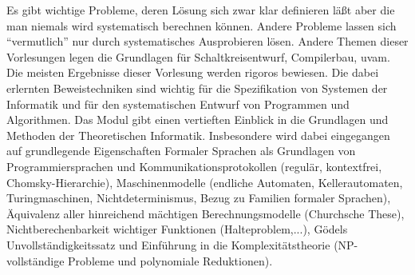\begin{module}
\begin{content}
Es gibt wichtige Probleme, deren Lösung sich zwar klar definieren läßt aber die man niemals wird systematisch berechnen können. Andere Probleme lassen sich “vermutlich” nur durch systematisches Ausprobieren lösen. Andere Themen dieser Vorlesungen legen die Grundlagen für Schaltkreisentwurf, Compilerbau, uvam. Die meisten Ergebnisse dieser Vorlesung werden rigoros bewiesen. Die dabei erlernten Beweistechniken sind wichtig für die Spezifikation von Systemen der Informatik und für den systematischen Entwurf von Programmen und Algorithmen. \newline
Das Modul gibt einen vertieften Einblick in die Grundlagen und Methoden der Theoretischen Informatik. Insbesondere wird dabei eingegangen auf grundlegende Eigenschaften Formaler Sprachen als Grundlagen von Programmiersprachen und Kommunikationsprotokollen (regulär, kontextfrei, Chomsky-Hierarchie), Maschinenmodelle (endliche Automaten, Kellerautomaten, Turingmaschinen, Nichtdeterminismus, Bezug zu Familien formaler Sprachen), Äquivalenz aller hinreichend mächtigen Berechnungsmodelle (Churchsche These), Nichtberechenbarkeit wichtiger Funktionen (Halteproblem,...), Gödels Unvollständigkeitssatz und Einführung in die Komplexitätstheorie (NP-vollständige Probleme und polynomiale Reduktionen).


\end{content}



\end{module}

